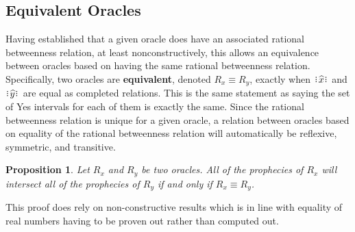 \documentclass[12pt]{article}
\newtheorem{proposition}{Proposition}[section]
\begin{document}
\subsection{Equivalent Oracles}

Having established that a given oracle does have an associated rational betweenness relation, at least nonconstructively, this allows an equivalence between oracles based on having the same rational betweenness relation. Specifically, two oracles are \textbf{equivalent}, denoted $R_x \equiv R_y$, exactly when $\xora$ and $\xora[y]$ are equal as completed relations. This is the same statement as saying the set of Yes intervals for each of them is exactly the same. Since the rational betweenness relation is unique for a given oracle, a relation between oracles based on equality of the rational betweenness relation will automatically be reflexive, symmetric, and transitive. 

 \begin{proposition}\label{os-equal}
Let $R_x$ and $R_y$ be two oracles. All of the prophecies of $R_x$ will intersect all of the prophecies of $R_y$ if and only if $R_x \equiv R_y$.
\end{proposition}

This proof does rely on non-constructive results which is in line with equality of real numbers having to be proven out rather than computed out. 
\end{document}
